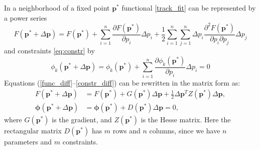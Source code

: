 
In a neighborhood of a fixed point $\boldsymbol{p}^*$ functional \eqref{track_fit} can be represented by a power series
\begin{equation}\label{func_diff}
F(\boldsymbol{p}^*+\Delta\boldsymbol{p}) = F(\boldsymbol{p}^*) + \sum_{i=1}^n \frac{\partial F(\boldsymbol{p}^*)}{\partial p_i} \Delta p_i + \frac{1}{2}\sum_{i=1}^n\sum_{j=1}^n \Delta p_i \frac{\partial^2 F(\boldsymbol{p}^*)}{\partial p_i \partial p_j} \Delta p_j
\end{equation}
and constraints \eqref{eq:constr} by
\begin{equation}\label{constr_diff}
\phi_k(\boldsymbol{p}^*+\Delta\boldsymbol{p}) = \phi_k(\boldsymbol{p}^*) + \sum_{i=1}^n \frac{\partial \phi_k(\boldsymbol{p}^*)}{\partial p_i}\Delta p_i = 0
\end{equation}
Equations (\ref{func_diff}--\ref{constr_diff}) can be rewritten in the matrix form as:
\begin{align}
\label{eq_diff1}
F(\boldsymbol{p}^*+\Delta\boldsymbol{p}) &= F(\boldsymbol{p}^*) + G(\boldsymbol{p}^*) \Delta\boldsymbol{p} + \frac{1}{2}\Delta\boldsymbol{p}^T Z(\boldsymbol{p}^*) \Delta\boldsymbol{p},\\
\label{eq_diff2}
\boldsymbol{\phi}(\boldsymbol{p}^*+\Delta\boldsymbol{p}) &= \boldsymbol{\phi}(\boldsymbol{p}^*) + D(\boldsymbol{p}^*) \Delta\boldsymbol{p} = 0,
\end{align}
where $G(\boldsymbol{p}^*)$ is the gradient, and $Z(\boldsymbol{p}^*)$ is the Hesse matrix.
Here the rectangular matrix $D(\boldsymbol{p}^*)$ has $m$ rows and $n$ columns, since we have $n$ parameters and $m$ constraints.

